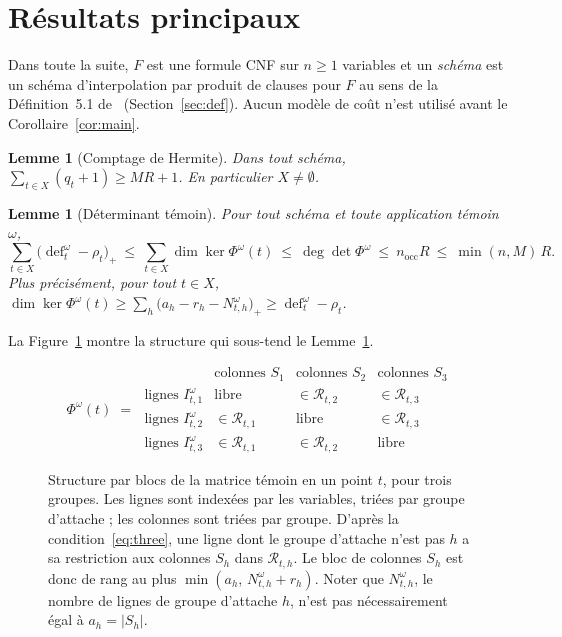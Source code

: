 \documentclass[11pt,a4paper]{article}
\newtheorem{lemma}[theorem]{Lemme}
\theoremstyle{definition}
\theoremstyle{remark}
\newcommand{\cR}{\mathcal{R}}
\newcommand{\dfc}{\operatorname{def}}
\newcommand{\nocc}{n_{\mathrm{occ}}}
\begin{document}
\section{Résultats principaux}\label{sec:results}

Dans toute la suite, $F$ est une formule CNF sur $n\ge1$ variables et un \emph{schéma} est un
schéma d'interpolation par produit de clauses pour $F$ au sens de la Définition~5.1
de~\cite{DL} (Section~\ref{sec:def}). Aucun modèle de coût n'est utilisé avant le
Corollaire~\ref{cor:main}.

\begin{lemma}[Comptage de Hermite]\label{lem:hermite}
Dans tout schéma, $\sum_{t\in X}(q_t+1)\ge MR+1$. En particulier $X\ne\emptyset$.
\end{lemma}

\begin{lemma}[Déterminant témoin]\label{lem:det}
Pour tout schéma et toute application témoin $\omega$,
\[
\sum_{t\in X}\bigl(\dfc^\omega_t-\rho_t\bigr)_+\ \le\ \sum_{t\in X}\dim\ker\Phi^\omega(t)
\ \le\ \deg\det\Phi^\omega\ \le\ \nocc R\ \le\ \min(n,M)\,R .
\]
Plus précisément, pour tout $t\in X$,
$\dim\ker\Phi^\omega(t)\ge\sum_h\bigl(a_h-r_h-N^\omega_{t,h}\bigr)_+\ge\dfc^\omega_t-\rho_t$.
\end{lemma}

La Figure~\ref{fig:blocks} montre la structure qui sous-tend le Lemme~\ref{lem:det}.

\begin{figure}[t]
\[
\Phi^\omega(t)\;=\;
\begin{array}{r|ccc}
 & \text{colonnes } S_{1} & \text{colonnes } S_{2} & \text{colonnes } S_{3}\\ \hline
\text{lignes } I^\omega_{t,1} & \text{libre} & \in\cR_{t,2} & \in\cR_{t,3}\\
\text{lignes } I^\omega_{t,2} & \in\cR_{t,1} & \text{libre} & \in\cR_{t,3}\\
\text{lignes } I^\omega_{t,3} & \in\cR_{t,1} & \in\cR_{t,2} & \text{libre}
\end{array}
\]
\caption{Structure par blocs de la matrice témoin en un point $t$, pour trois groupes. Les
lignes sont indexées par les variables, triées par groupe d'attache ; les colonnes sont
triées par groupe. D'après la condition~\eqref{eq:three}, une ligne dont le groupe d'attache
n'est pas $h$ a sa restriction aux colonnes $S_h$ dans $\cR_{t,h}$. Le bloc de colonnes
$S_h$ est donc de rang au plus $\min(a_h,\,N^\omega_{t,h}+r_h)$. Noter que $N^\omega_{t,h}$,
le nombre de lignes de groupe d'attache $h$, n'est pas nécessairement égal à
$a_h=|S_h|$.}\label{fig:blocks}
\end{figure}
\end{document}
